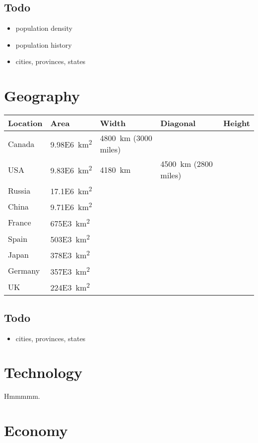 \documentclass{article}
\begin{document}
\subsection{Todo}
	\begin{itemize}
		\item population density
		\item population history
		\item cities, provinces, states
	\end{itemize}

\section{Geography}
\begin{table}[H]
	\centering
	\begin{tabularx}{\textwidth}{ X X X X X }
		Location & Area & Width & Diagonal & Height \\
		\hline
		Canada & \SI{9.98E6}{\square\km} & \SI{4800}{\km} (3000 miles) & & \\
		USA & \SI{9.83E6}{\square\km} & \SI{4180}{\km} & \SI{4500}{\km} (2800 miles) & \\
		Russia & \SI{17.1E6}{\square\km} & & & \\
		China & \SI{9.71E6}{\square\km} & & & \\
		France & \SI{675E3}{\square\km} & & & \\
		Spain & \SI{503E3}{\square\km} & & & \\
		Japan & \SI{378E3}{\square\km} & & & \\
		Germany & \SI{357E3}{\square\km} & & & \\
		UK & \SI{224E3}{\square\km} & & & \\
	\end{tabularx}
\end{table}
\subsection{Todo}
	\begin{itemize}
		\item cities, provinces, states
	\end{itemize}

\section{Technology}
Hmmmmm.

\section{Economy}
\end{document}
